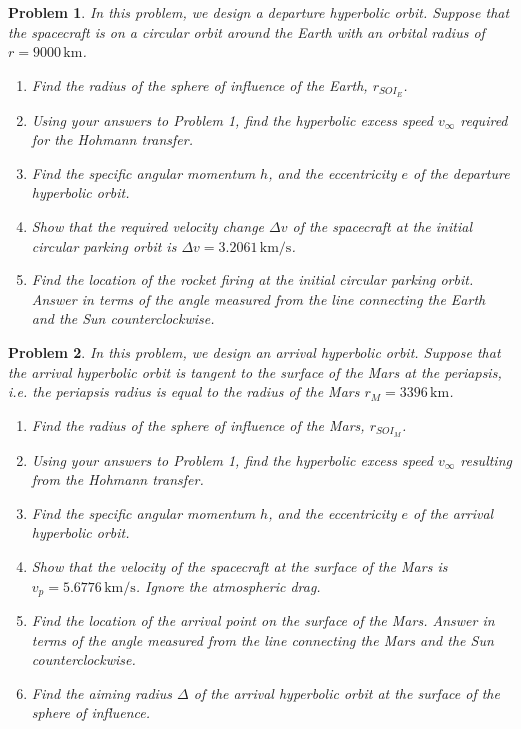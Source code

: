 \documentclass[10pt]{article}
\theoremstyle{plain}\theorembodyfont{\normalfont}
\newtheorem{prob}{Problem}[section]
\newenvironment{subprob}%
{\renewcommand{\theenumi}{\alph{enumi}}\renewcommand{\labelenumi}{(\theenumi)}\begin{enumerate}}%
{\end{enumerate}}%
\begin{document}
\begin{prob}
In this problem, we design a departure hyperbolic orbit. Suppose that the spacecraft is on a circular orbit around the Earth with an orbital radius of $r=9000\,\mathrm{km}$.
\begin{subprob}
\item Find the radius of the sphere of influence of the Earth, $r_{SOI_E}$. %
\item Using your answers to Problem 1, find the hyperbolic excess speed $v_\infty$ required for the Hohmann transfer.
\item Find the specific angular momentum $h$, and the eccentricity $e$ of the departure hyperbolic orbit.
\item Show that the required velocity change $\Delta v$ of the spacecraft at the initial circular parking orbit is $\Delta v = 3.2061\,\mathrm{km/s}$.  

\item Find the location of the rocket firing at the initial circular parking orbit. Answer in terms of the angle measured from the line connecting the Earth and the Sun counterclockwise.
\end{subprob}
\end{prob}

\begin{prob} 
In this problem, we design an arrival hyperbolic orbit. Suppose that the arrival hyperbolic orbit is tangent to the surface of the Mars at the periapsis, i.e. the periapsis radius is equal to the radius of the Mars $r_{M}=3396\,\mathrm{km}$.
\begin{subprob}
\item Find the radius of the sphere of influence of the Mars, $r_{SOI_M}$. %
\item Using your answers to Problem 1, find the hyperbolic excess speed $v_\infty$ resulting from the Hohmann transfer.
\item Find the specific angular momentum $h$, and the eccentricity $e$ of the arrival hyperbolic orbit.
\item Show that the velocity of the spacecraft at the surface of the Mars is $v_p=5.6776\,\mathrm{km/s}$. Ignore the atmospheric drag. 
\item Find the location of the arrival point on the surface of the Mars. Answer in terms of the angle measured from the line connecting the Mars and the Sun counterclockwise.
\item Find the aiming radius $\Delta$ of the arrival hyperbolic orbit at the surface of the sphere of influence.
\end{subprob}
\end{prob}

\end{document}
